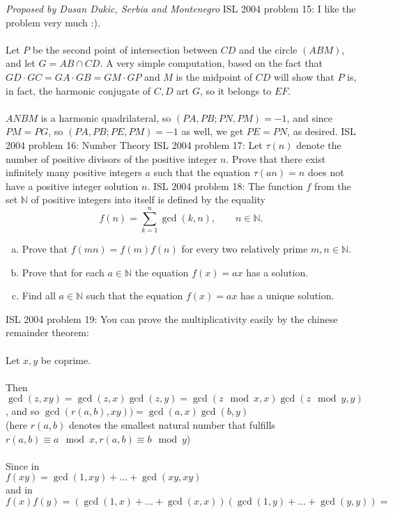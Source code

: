 \textit{Proposed by Dusan Dukic, Serbia and Montenegro} 
ISL 2004 problem 15:  I like the problem very much :). \\\\
Let $P$ be the second point of intersection between $CD$ and the circle $(ABM)$, and let $G=AB\cap CD$. A very simple computation, based on the fact that $GD\cdot GC=GA\cdot GB=GM\cdot GP$ and $M$ is the midpoint of $CD$ will show that $P$ is, in fact, the harmonic conjugate of $C,D$ art $G$, so it belongs to $EF$. \\\\
$ANBM$ is a harmonic quadrilateral, so $(PA,PB;PN,PM)=-1$, and since $PM=PG$, so $(PA,PB;PE,PM)=-1$ as well, we get $PE=PN$, as desired. 
ISL 2004 problem 16:  Number Theory 
ISL 2004 problem 17:  Let $\tau(n)$ denote the number of positive divisors of the positive integer $n$. Prove that there exist infinitely many positive integers $a$ such that the equation $ \tau(an)=n $ does not have a positive integer solution $n$. 
ISL 2004 problem 18:  The function $f$ from the set $\mathbb{N}$ of positive integers into itself is defined by the equality
\[ f(n)=\sum_{k=1}^n \gcd(k,n),\qquad n\in \mathbb{N}. \]
\begin{enumerate}[a)]
  \item Prove that $f(mn)=f(m)f(n)$ for every two relatively prime ${m,n\in\mathbb{N}}$.
  \item Prove that for each $a\in\mathbb{N}$ the equation $f(x)=ax$ has a solution.
  \item Find all ${a\in\mathbb{N}}$ such that the equation $f(x)=ax$ has a unique solution.
\end{enumerate} 
ISL 2004 problem 19:  You can prove the multiplicativity easily by the chinese remainder theorem: \\\\
Let $x,y$ be coprime. \\\\
Then $\gcd(z,xy) = \gcd(z,x)\gcd(z,y) = \gcd(z \mod x,x)\gcd(z \mod y,y)$, and so $\gcd(r(a,b),xy))=\gcd(a,x)\gcd(b,y)$ \\
(here $r(a,b)$ denotes the smallest natural number that fulfills $r(a,b) \equiv a \mod x,r(a,b) \equiv b \mod y$) \\\\
Since in \\
$f(xy)=\gcd(1,xy)+...+\gcd(xy,xy)$ \\
and in \\
$f(x)f(y) = (\gcd(1,x)+...+\gcd(x,x))(\gcd(1,y)+...+\gcd(y,y)) =$ \\
